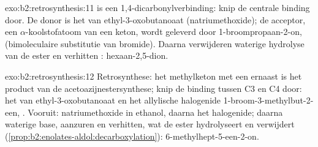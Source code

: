 \begin{solution}{exo:b2:retrosynthesis:11}
 is een 1,4-dicarbonylverbinding: knip de centrale binding  door. De donor is het  van
ethyl-3-oxobutanoaat (natriumethoxide); de acceptor, een $\alpha$-koolstofatoom van een keton, wordt geleverd door
1-broompropaan-2-on,  (bimoleculaire substitutie van bromide). Daarna verwijderen waterige hydrolyse van
de ester en verhitten : hexaan-2,5-dion.
\end{solution}

\begin{solution}{exo:b2:retrosynthesis:12}
Retrosynthese: het methylketon met een  ernaast is het product van de acetoazijnestersynthese;
knip de binding tussen C3 en C4 door: het  van ethyl-3-oxobutanoaat en het allylische halogenide
1-broom-3-methylbut-2-een, . Vooruit: natriumethoxide in ethanol, daarna het halogenide;
daarna waterige base, aanzuren en verhitten, wat de ester hydrolyseert en  verwijdert
(\cref{prop:b2:enolates-aldol:decarboxylation}): 6-methylhept-5-een-2-on.
\end{solution}

